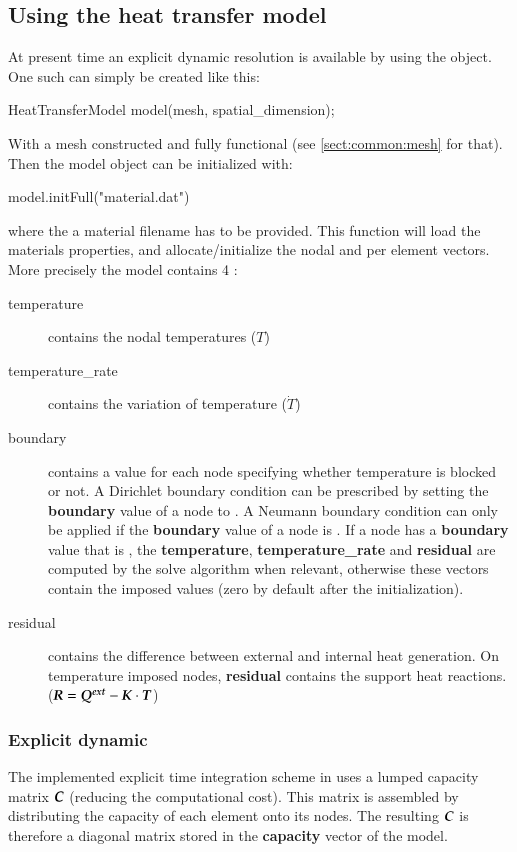 \subsection{Using the heat transfer model}
At present time an explicit dynamic resolution is available by
using the   object.
One such can simply be created like this:
\begin{cpp}
  HeatTransferModel model(mesh, spatial_dimension);
\end{cpp}
With a mesh constructed and fully functional (see \ref{sect:common:mesh} for that).
Then the model object can be initialized with:
\begin{cpp}
  model.initFull("material.dat")
\end{cpp}
where the a material filename has to be provided. This function will load the materials 
properties, and allocate/initialize the nodal and per element vectors.
More precisely the model contains 4 :
\begin{description}
\item[temperature] contains the nodal temperatures ($T$) 
\item[temperature\_rate] contains the variation of temperature ($\dot{T}$) 
\item[boundary]  contains a    value for  each  node
  specifying  whether  temperature is  blocked  or  not. A  Dirichlet  boundary
  condition can be prescribed by setting the \textbf{boundary} value of a node 
  to  .  A Neumann boundary condition  can only be applied
  if the  \textbf{boundary} value of a node is  . If a
  node has a  \textbf{boundary} value  that is  , the
  \textbf{temperature},     \textbf{temperature\_rate} and
  \textbf{residual} are computed by the solve algorithm when relevant, otherwise
  these  vectors  contain   the  imposed  values  (zero  by   default  after  the
  initialization).
\item[residual] contains the difference between external and internal heat generation. On
  temperature imposed nodes,  \textbf{residual} contains the support heat reactions. ($\boldsymbol{R} = \boldsymbol{Q^{ext}} -\boldsymbol{K} \cdot \boldsymbol{T}$)
\end{description}

\subsubsection{Explicit dynamic}

The implemented explicit  time integration scheme in \akantu  uses a lumped capacity
matrix $\boldsymbol{C}$ (reducing the computational  cost). This matrix is assembled by
distributing the capacity of each element onto its nodes. The resulting $\boldsymbol{C}$ is
therefore a diagonal matrix stored in the \textbf{capacity} vector of the model.

